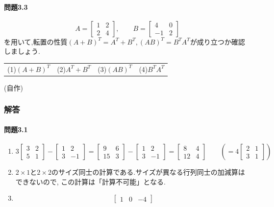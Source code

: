 \paragraph{問題3.3}
\[A = \begin{bmatrix}
    1 & 2 \\ 2 & 4
\end{bmatrix},\qquad
B = \begin{bmatrix}
    4 & 0  \\ -1 & 2 
\end{bmatrix}\]
を用いて,転置の性質$(A+B)^T=A^T+B^T,(AB)^T=B^TA^T$が成り立つか確認しましょう.\smallskip\\
\begin{tabular}{llll}
    (1)$(A+B)^T$ &
    (2)$A^T+B^T$ &
    (3)$(AB)^T$ &
    (4)$B^TA^T$ 
\end{tabular}
\begin{flushright}
    (自作)
\end{flushright}
\subsubsection*{解答}
\paragraph{問題3.1}
\begin{enumerate}[label=(\arabic*)]
    \item 
    \[3\begin{bmatrix}
        3 & 2 \\ 5 & 1
    \end{bmatrix}-\begin{bmatrix}
        1 & 2 \\ 3 & -1
    \end{bmatrix}=
    \begin{bmatrix}
        9 & 6 \\ 15 & 3
    \end{bmatrix}-\begin{bmatrix}
        1 & 2 \\ 3 & -1
    \end{bmatrix}=\begin{bmatrix}
        8 & 4 \\ 12 & 4
    \end{bmatrix}\qquad\left(=4\begin{bmatrix}
        2 & 1 \\ 3 & 1
    \end{bmatrix}\right)\]
    \item $2\times1$と$2\times2$のサイズ同士の計算である.サイズが異なる行列同士の加減算はできないので,
    この計算は「計算不可能」となる.
    \item \[\begin{bmatrix}
        1 & 0 & -4
    \end{bmatrix}\]
\end{enumerate}
